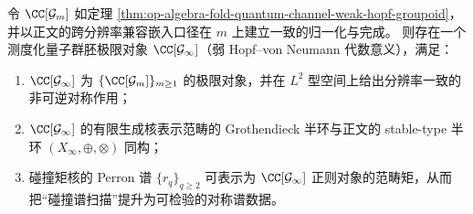 \begin{conjecture}\label{conj:op-algebra-fold-quantum-channel-limit-groupoid}
令 \(\CC[\mathcal{G}_m]\) 如定理 \ref{thm:op-algebra-fold-quantum-channel-weak-hopf-groupoid}，并以正文的跨分辨率兼容嵌入口径在 \(m\) 上建立一致的归一化与完成。
则存在一个测度化量子群胚极限对象 \(\CC[\mathcal{G}_\infty]\)（弱 Hopf--von Neumann 代数意义），满足：
\begin{enumerate}
  \item \(\CC[\mathcal{G}_\infty]\) 为 \(\{\CC[\mathcal{G}_m]\}_{m\ge 1}\) 的极限对象，并在 \(L^2\) 型空间上给出分辨率一致的非可逆对称作用；
  \item \(\CC[\mathcal{G}_\infty]\) 的有限生成核表示范畴的 Grothendieck 半环与正文的 stable-type 半环 \((X_\infty,\oplus,\otimes)\) 同构；
  \item 碰撞矩核的 Perron 谱 \(\{r_q\}_{q\ge 2}\) 可表示为 \(\CC[\mathcal{G}_\infty]\) 正则对象的范畴矩，从而把“碰撞谱扫描”提升为可检验的对称谱数据。
\end{enumerate}
\end{conjecture}

\endinput

